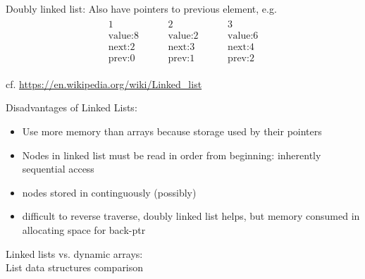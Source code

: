 \documentclass[10pt]{amsart}
\begin{document}
\begin{multicols*}{2}
Doubly linked list: Also have pointers to previous element, e.g.
\[
\begin{gathered}
\begin{gathered}
1 \\
\text{value:} 8 \\
\text{next:} 2 \\
\text{prev:} 0
\end{gathered} \qquad \, 
\begin{gathered}
2 \\
\text{value:} 2 \\
\text{next:} 3 \\
\text{prev:} 1
\end{gathered} \qquad \, 
\begin{gathered}
3 \\
\text{value:} 6 \\
\text{next:} 4 \\
\text{prev:} 2
\end{gathered}
\end{gathered}
\]

cf. \url{https://en.wikipedia.org/wiki/Linked_list}

Disadvantages of Linked Lists:
\begin{itemize}
	\item Use more memory than arrays because storage used by their pointers
	\item Nodes in linked list must be read in order from beginning: inherently sequential access
	\item nodes stored in continguously (possibly)
	\item difficult to reverse traverse, doubly linked list helps, but memory consumed in allocating space for back-ptr
\end{itemize}

Linked lists vs. dynamic arrays: \\
List data structures comparison \\


\end{multicols*}
\end{document}
